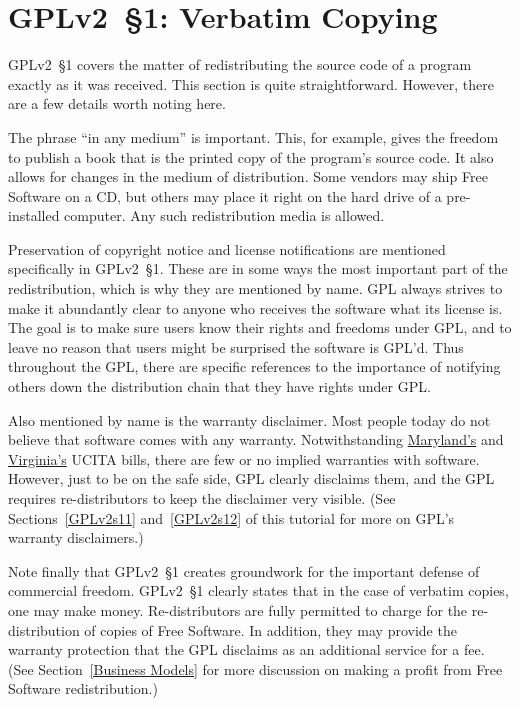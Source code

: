 \section{GPLv2~\S1: Verbatim Copying}
\label{GPLv2s1}

GPLv2~\S1 covers the matter of redistributing the source code of a program
exactly as it was received. This section is quite straightforward.
However, there are a few details worth noting here.

The phrase ``in any medium'' is important.  This, for example, gives the
freedom to publish a book that is the printed copy of the program's source
code.  It also allows for changes in the medium of distribution.  Some
vendors may ship Free Software on a CD, but others may place it right on
the hard drive of a pre-installed computer.  Any such redistribution media
is allowed.

Preservation of copyright notice and license notifications are mentioned
specifically in GPLv2~\S1.  These are in some ways the most important part of
the redistribution, which is why they are mentioned by name.  GPL
always strives to make it abundantly clear to anyone who receives the
software what its license is.  The goal is to make sure users know their
rights and freedoms under GPL, and to leave no reason that users might be
surprised the software is GPL'd. Thus
throughout the GPL, there are specific references to the importance of
notifying others down the distribution chain that they have rights under
GPL.

Also mentioned by name is the warranty disclaimer. Most people today do
not believe that software comes with any warranty.  Notwithstanding
\href{http://mlis.state.md.us/2000rs/billfile/hb0019.htm}{Maryland's} and \href{http://leg1.state.va.us/cgi-bin/legp504.exe?001+ful+SB372ER}{Virginia's} UCITA bills, there are few or no implied warranties with software.
However, just to be on the safe side, GPL clearly disclaims them, and the
GPL requires re-distributors to keep the disclaimer very visible. (See
Sections~\ref{GPLv2s11} and~\ref{GPLv2s12} of this tutorial for more on GPL's
warranty disclaimers.)

Note finally that GPLv2~\S1 creates groundwork for the important defense of
commercial freedom.  GPLv2~\S1 clearly states that in the case of verbatim
copies, one may make money.  Re-distributors are fully permitted to charge
for the re-distribution of copies of Free Software. In addition, they may
provide the warranty protection that the GPL disclaims as an additional
service for a fee. (See Section~\ref{Business Models} for more discussion
on making a profit from Free Software redistribution.)

